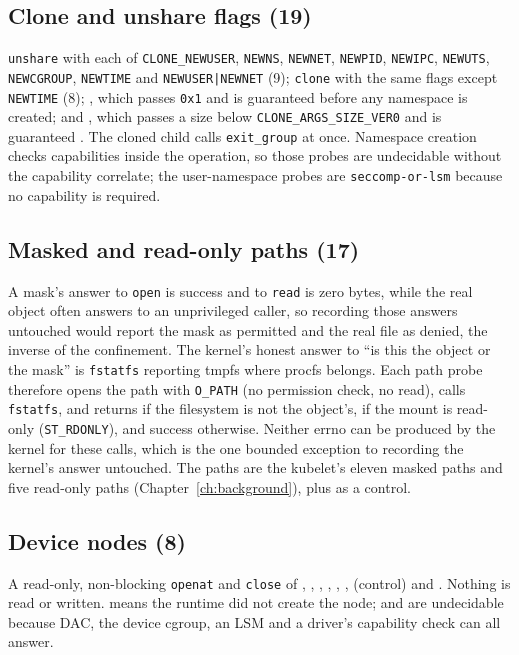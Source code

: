 \subsection{Clone and unshare flags (19)}
{\raggedright
\texttt{unshare} with each of \texttt{CLONE\_NEWUSER}, \texttt{NEWNS}, \texttt{NEWNET}, \texttt{NEWPID}, \texttt{NEWIPC}, \texttt{NEWUTS}, \texttt{NEWCGROUP}, \texttt{NEWTIME} and \texttt{NEWUSER|NEWNET} (9); \texttt{clone} with the same flags except \texttt{NEWTIME} (8); , which passes \texttt{0x1} and is guaranteed  before any namespace is created; and , which passes a size below \texttt{CLONE\_ARGS\_SIZE\_VER0} and is guaranteed . The cloned child calls \texttt{exit\_group} at once. Namespace creation checks capabilities inside the operation, so those probes are undecidable without the capability correlate; the user-namespace probes are \texttt{seccomp-or-lsm} because no capability is required.\par}

\subsection{Masked and read-only paths (17)}
A mask's answer to \texttt{open} is success and to \texttt{read} is zero bytes, while the real object often answers  to an unprivileged caller, so recording those answers untouched would report the mask as permitted and the real file as denied, the inverse of the confinement. The kernel's honest answer to ``is this the object or the mask'' is \texttt{fstatfs} reporting tmpfs where procfs belongs. Each path probe therefore opens the path with \texttt{O\_PATH} (no permission check, no read), calls \texttt{fstatfs}, and returns  if the filesystem is not the object's,  if the mount is read-only (\texttt{ST\_RDONLY}), and success otherwise. Neither errno can be produced by the kernel for these calls, which is the one bounded exception to recording the kernel's answer untouched. The paths are the kubelet's eleven masked paths and five read-only paths (Chapter~\ref{ch:background}), plus  as a control.

\subsection{Device nodes (8)}
A read-only, non-blocking \texttt{openat} and \texttt{close} of , , , , , ,  (control) and . Nothing is read or written.  means the runtime did not create the node;  and  are undecidable because DAC, the device cgroup, an LSM and a driver's capability check can all answer.


